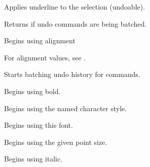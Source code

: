 
Applies underline to the selection (undoable).

\label{wxrichtextctrlbatchingundo}


Returns \true if undo commands are being batched.

\label{wxrichtextctrlbeginalignment}


Begins using alignment

For alignment values, see .

\label{wxrichtextctrlbeginbatchundo}


Starts batching undo history for commands.

\label{wxrichtextctrlbeginbold}


Begins using bold.

\label{wxrichtextctrlbegincharacterstyle}


Begins using the named character style.

\label{wxrichtextctrlbeginfont}


Begins using this font.

\label{wxrichtextctrlbeginfontsize}


Begins using the given point size.

\label{wxrichtextctrlbeginitalic}


Begins using italic.

\label{wxrichtextctrlbeginleftindent}

